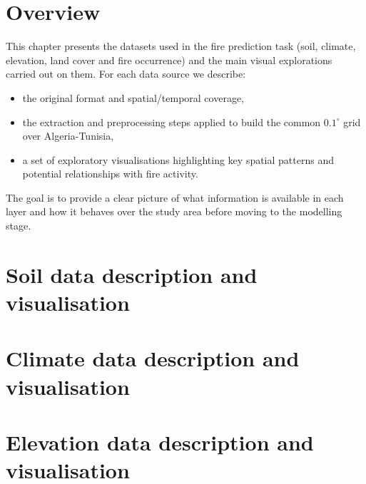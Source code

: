 \section{Overview}

This chapter presents the datasets used in the fire prediction task
(soil, climate, elevation, land cover and fire occurrence) and the main
visual explorations carried out on them. For each data source we
describe:
\begin{itemize}
    \item the original format and spatial/temporal coverage,
    \item the extraction and preprocessing steps applied to build the
          common $0.1^{\circ}$ grid over Algeria-Tunisia,
    \item a set of exploratory visualisations highlighting key spatial
          patterns and potential relationships with fire activity.
\end{itemize}

The goal is to provide a clear picture of what information is available
in each layer and how it behaves over the study area before moving to
the modelling stage.

\section{Soil data description and visualisation}


\section{Climate data description and visualisation}


\section{Elevation data description and visualisation}


